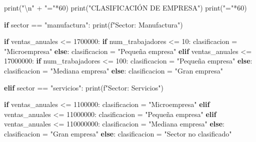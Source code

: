 \documentclass[
  doc,
  floatsintext,
  longtable,
  a4paper,
  nolmodern,
  notxfonts,
  notimes,
  12pt,
  colorlinks=true,linkcolor=blue,citecolor=blue,urlcolor=blue]{apa7}
\newenvironment{Shaded}{\begin{snugshade}}{\end{snugshade}}
\newcommand{\BuiltInTok}[1]{\textcolor[rgb]{0.00,0.23,0.31}{#1}}
\newcommand{\CharTok}[1]{\textcolor[rgb]{0.13,0.47,0.30}{#1}}
\newcommand{\ControlFlowTok}[1]{\textcolor[rgb]{0.00,0.23,0.31}{\textbf{#1}}}
\newcommand{\DecValTok}[1]{\textcolor[rgb]{0.68,0.00,0.00}{#1}}
\newcommand{\NormalTok}[1]{\textcolor[rgb]{0.00,0.23,0.31}{#1}}
\newcommand{\OperatorTok}[1]{\textcolor[rgb]{0.37,0.37,0.37}{#1}}
\newcommand{\SpecialStringTok}[1]{\textcolor[rgb]{0.13,0.47,0.30}{#1}}
\newcommand{\StringTok}[1]{\textcolor[rgb]{0.13,0.47,0.30}{#1}}
\begin{document}
\begin{Shaded}
\begin{Highlighting}[]
\BuiltInTok{print}\NormalTok{(}\StringTok{"}\CharTok{\textbackslash{}n}\StringTok{"} \OperatorTok{+} \StringTok{"="}\OperatorTok{*}\DecValTok{60}\NormalTok{)}
\BuiltInTok{print}\NormalTok{(}\StringTok{"CLASIFICACIÓN DE EMPRESA"}\NormalTok{)}
\BuiltInTok{print}\NormalTok{(}\StringTok{"="}\OperatorTok{*}\DecValTok{60}\NormalTok{)}

\ControlFlowTok{if}\NormalTok{ sector }\OperatorTok{==} \StringTok{"manufactura"}\NormalTok{:}
    \BuiltInTok{print}\NormalTok{(}\SpecialStringTok{f"Sector: Manufactura"}\NormalTok{)}
    
    \ControlFlowTok{if}\NormalTok{ ventas\_anuales }\OperatorTok{\textless{}=} \DecValTok{1700000}\NormalTok{:}
        \ControlFlowTok{if}\NormalTok{ num\_trabajadores }\OperatorTok{\textless{}=} \DecValTok{10}\NormalTok{:}
\NormalTok{            clasificacion }\OperatorTok{=} \StringTok{"Microempresa"}
        \ControlFlowTok{else}\NormalTok{:}
\NormalTok{            clasificacion }\OperatorTok{=} \StringTok{"Pequeña empresa"}
    \ControlFlowTok{elif}\NormalTok{ ventas\_anuales }\OperatorTok{\textless{}=} \DecValTok{17000000}\NormalTok{:}
        \ControlFlowTok{if}\NormalTok{ num\_trabajadores }\OperatorTok{\textless{}=} \DecValTok{100}\NormalTok{:}
\NormalTok{            clasificacion }\OperatorTok{=} \StringTok{"Pequeña empresa"}
        \ControlFlowTok{else}\NormalTok{:}
\NormalTok{            clasificacion }\OperatorTok{=} \StringTok{"Mediana empresa"}
    \ControlFlowTok{else}\NormalTok{:}
\NormalTok{        clasificacion }\OperatorTok{=} \StringTok{"Gran empresa"}

\ControlFlowTok{elif}\NormalTok{ sector }\OperatorTok{==} \StringTok{"servicios"}\NormalTok{:}
    \BuiltInTok{print}\NormalTok{(}\SpecialStringTok{f"Sector: Servicios"}\NormalTok{)}
    
    \ControlFlowTok{if}\NormalTok{ ventas\_anuales }\OperatorTok{\textless{}=} \DecValTok{1100000}\NormalTok{:}
\NormalTok{        clasificacion }\OperatorTok{=} \StringTok{"Microempresa"}
    \ControlFlowTok{elif}\NormalTok{ ventas\_anuales }\OperatorTok{\textless{}=} \DecValTok{11000000}\NormalTok{:}
\NormalTok{        clasificacion }\OperatorTok{=} \StringTok{"Pequeña empresa"}
    \ControlFlowTok{elif}\NormalTok{ ventas\_anuales }\OperatorTok{\textless{}=} \DecValTok{110000000}\NormalTok{:}
\NormalTok{        clasificacion }\OperatorTok{=} \StringTok{"Mediana empresa"}
    \ControlFlowTok{else}\NormalTok{:}
\NormalTok{        clasificacion }\OperatorTok{=} \StringTok{"Gran empresa"}
\ControlFlowTok{else}\NormalTok{:}
\NormalTok{    clasificacion }\OperatorTok{=} \StringTok{"Sector no clasificado"}


\end{Highlighting}
\end{Shaded}
\end{document}
